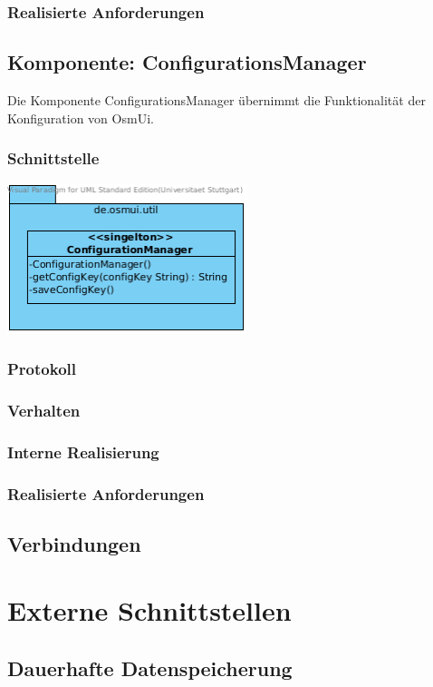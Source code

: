 \documentclass[a4paper,12pt]{scrartcl}
\begin{document}
\subsubsection{Realisierte Anforderungen}

\subsection{Komponente: ConfigurationsManager}
Die Komponente ConfigurationsManager übernimmt die Funktionalität der Konfiguration von OsmUi.
\subsubsection{Schnittstelle}
\begin{center}
\includegraphics[width=7cm]{Schnittstelle_ConfigurationManager.png}
\end{center}
\subsubsection{Protokoll}
\subsubsection{Verhalten}
\subsubsection{Interne Realisierung}
\subsubsection{Realisierte Anforderungen}

\subsection{Verbindungen}

\section{Externe Schnittstellen}
\subsection{Dauerhafte Datenspeicherung}
\end{document}
